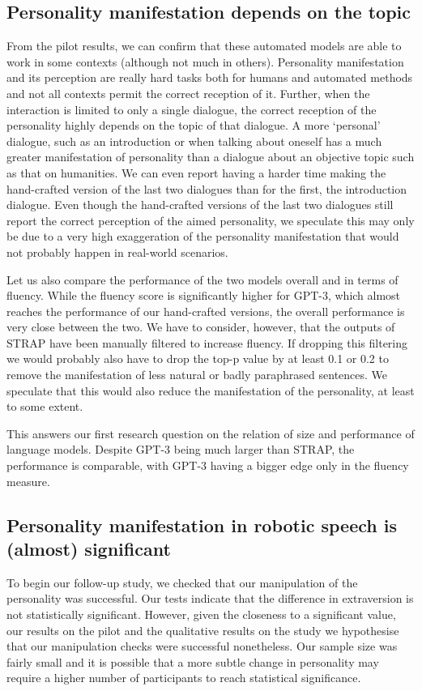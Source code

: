 \documentclass[nomenclature, english, biblatex]{kththesis}
\begin{document}
\subsection{Personality manifestation depends on the topic} 
From the pilot results, we can confirm that these automated models are able to work in some contexts (although not much in others). Personality manifestation and its perception are really hard tasks both for humans and automated methods and not all contexts permit the correct reception of it. Further, when the interaction is limited to only a single dialogue, the correct reception of the personality highly depends on the topic of that dialogue. A more `personal' dialogue, such as an introduction or when talking about oneself has a much greater manifestation of personality than a dialogue about an objective topic such as that on humanities. We can even report having a harder time making the hand-crafted version of the last two dialogues than for the first, the introduction dialogue. Even though the hand-crafted versions of the last two dialogues still report the correct perception of the aimed personality, we speculate this may only be due to a very high exaggeration of the personality manifestation that would not probably happen in real-world scenarios.

Let us also compare the performance of the two models overall and in terms of fluency. While the fluency score is significantly higher for GPT-3, which almost reaches the performance of our hand-crafted versions, the overall performance is very close between the two. We have to consider, however, that the outputs of STRAP have been manually filtered to increase fluency. If dropping this filtering we would probably also have to drop the top-p value by at least 0.1 or 0.2 to remove the manifestation of less natural or badly paraphrased sentences. We speculate that this would also reduce the manifestation of the personality, at least to some extent.

This answers our first research question on the relation of size and performance of language models. Despite GPT-3 being much larger than STRAP, the performance is comparable, with GPT-3 having a bigger edge only in the fluency measure.

\subsection{Personality manifestation in robotic speech is (almost) significant}
To begin our follow-up study, we checked that our manipulation of the personality was successful. Our tests indicate that the difference in extraversion is not statistically significant. However, given the closeness to a significant value, our results on the pilot and the qualitative results on the study we hypothesise that our manipulation checks were successful nonetheless. Our sample size was fairly small and it is possible that a more subtle change in personality may require a higher number of participants to reach statistical significance.
\end{document}
